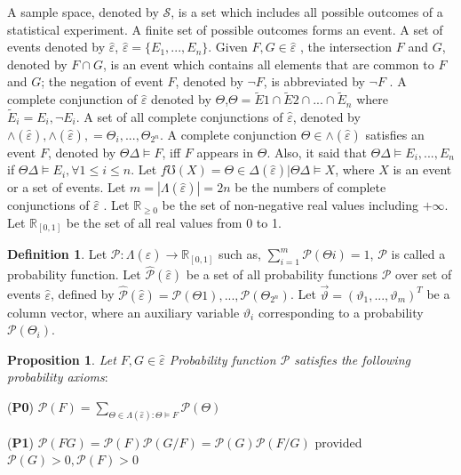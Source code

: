\documentclass[]{iosart2c}
\begin{document}
  A sample space, denoted by $\mathcal S$, is a set which includes all possible outcomes of a statistical experiment. A finite set of possible outcomes forms an event. A set of events denoted by $\hat{\varepsilon}$, $\hat{\varepsilon} = \{ E _1, ... , E_n \}$. Given $F,G \in \hat{\varepsilon}$ , the intersection $F$ and $G$, denoted by $F \cap G$, is an event which contains all elements that are common to $F$ and $G$; the negation of event $F$, denoted by $\neg F$, is abbreviated by $\neg F$ . A complete conjunction of $\hat{\varepsilon}$ denoted by $\Theta$,$\Theta = \tilde E1 \cap \tilde E2 \cap ... \cap \tilde E_n$ where $\tilde E_i = {E_i, \neg E_i}$. A set of all complete conjunctions of $\hat{\varepsilon}$, denoted by $\wedge (\hat{\varepsilon}),\wedge (\hat{\varepsilon}),= {\Theta_i, ... , \Theta_{2^n}  }$. A complete conjunction $\Theta \in \wedge (\hat{\varepsilon} )$ satisfies an event $F$, denoted by $\Theta \Delta \models F$, iff  $F$ appears in $\Theta$. Also, it said that $\Theta \Delta \models {E_i, ... , E_n}$ if $\Theta \Delta \models E_i, \forall 1 \le i \le n$. Let $f\mho (X) = {\Theta \in \Delta (\hat{\varepsilon} )|\Theta \Delta \models X}$, where $X$ is an event or a set of events. Let $m = |\Lambda(\hat{\varepsilon})| = 2n$ be the numbers of complete conjunctions of $\hat{\varepsilon}$ . Let $\mathbb{R}_{\geq0}$ be the set of non-negative real values including $+\infty$. Let $\mathbb{R}_{[0,1]}$ be the set of all real values from 0 to 1.


  \textbf{Definition 1}. Let $\mathcal{P} : \Lambda(\hat{\varepsilon}) \to \mathbb{R}_{[0,1]}$ such as,
  $\sum_{i=1}^m \mathcal{P} (\Theta i) = 1$, $\mathcal{P}$ is called a probability function.
  Let $\hat{\mathcal{P}} (\hat  \varepsilon )$ be a set of all probability functions $\mathcal{P}$ over set of events $\hat  \varepsilon$, defined by $\hat{\mathcal{P}}(\hat  \varepsilon) =  {\mathcal{P} (\Theta1), ... ,\mathcal{P} (\Theta_{2^n} )}$. Let $\vec{\vartheta} = (\vartheta_1, ... , \vartheta_m)^T$ be a column vector, where an auxiliary variable $\vartheta_i$ corresponding to a probability $\mathcal{P}(\Theta_i)$.


  \textbf{Proposition 1}. \textit{Let $F,G \in \hat{\varepsilon}$ Probability function $\mathcal{P}$ satisfies the following probability axioms}:

  (\textbf{P0}) $\mathcal{P}(F) = \sum_{\Theta  \in  \Lambda (\hat{\varepsilon}):\Theta  \models F}\mathcal{P}(\Theta)$

  (\textbf{P1}) $\mathcal{P} (FG) = \mathcal{P} (F) \mathcal{P} (G/F) = \mathcal{P} (G) \mathcal{P} (F/G)$ provided $\mathcal{P} (G) > 0,\mathcal{P} (F) > 0$
\end{document}
